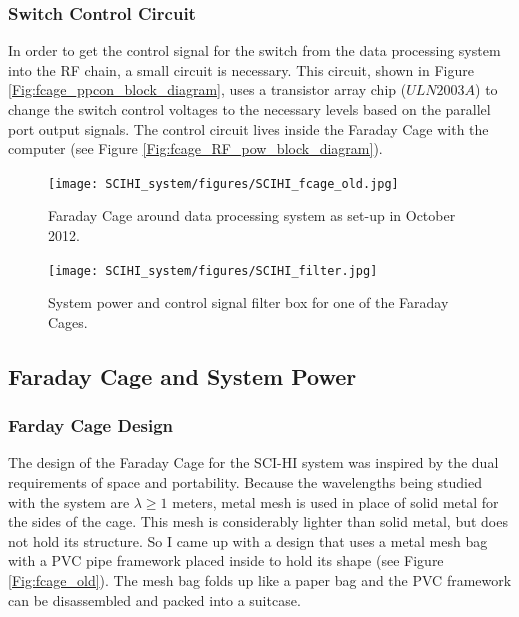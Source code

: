 \subsubsection{Switch Control Circuit}

In order to get the control signal for the switch from the data processing system into the RF chain, a small circuit is necessary. This circuit, shown in Figure \ref{Fig:fcage_ppcon_block_diagram}, uses a transistor array chip ($ULN2003A$) to change the switch control voltages to the necessary levels based on the parallel port output signals. The control circuit lives inside the Faraday Cage with the computer (see Figure \ref{Fig:fcage_RF_pow_block_diagram}). 

\begin{figure}[htb]
\centering
\begin{minipage}[b]{0.36\textwidth}
\centering
\texttt{[image: SCIHI\_system/figures/SCIHI\_fcage\_old.jpg]}
\caption{Faraday Cage around data processing system as set-up in October 2012.}
\label{Fig:fcage_old}
\end{minipage}%
\begin{minipage}[b]{0.02\textwidth}
\hspace{1cm}
\end{minipage}%
\begin{minipage}[b]{0.58\textwidth}
\centering
\texttt{[image: SCIHI\_system/figures/SCIHI\_filter.jpg]}
\caption{System power and control signal filter box for one of the Faraday Cages.}
\label{Fig:fcage_filter}
\end{minipage}
\end{figure}

\subsection{Faraday Cage and System Power}

\subsubsection{Farday Cage Design}

The design of the Faraday Cage for the SCI-HI system was inspired by the dual requirements of space and portability. Because the wavelengths being studied with the system are $\lambda \geq 1$ meters, metal mesh is used in place of solid metal for the sides of the cage. This mesh is considerably lighter than solid metal, but does not hold its structure. So I came up with a design that uses a metal mesh bag with a PVC pipe framework placed inside to hold its shape (see Figure \ref{Fig:fcage_old}). The mesh bag folds up like a paper bag and the PVC framework can be disassembled and packed into a suitcase. 

